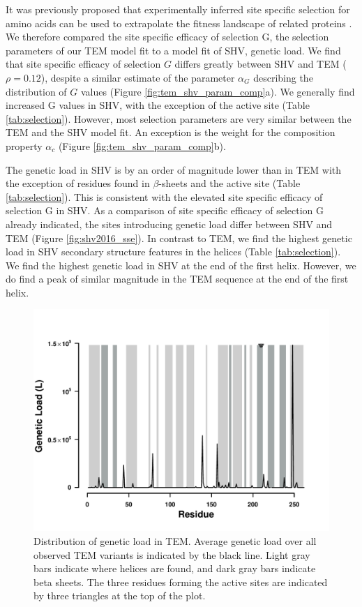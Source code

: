 \documentclass[12pt]{article}
\begin{document}
It was previously proposed that experimentally inferred site specific selection for amino acids can be used to extrapolate the fitness landscape of related proteins \citep{bloom2014, bloom2017}.
We therefore compared the site specific efficacy of selection G, the \selac selection parameters of our \selac TEM model fit to a \selac model fit of SHV, genetic load.
We find that site specific efficacy of selection $G$ differs greatly between SHV and TEM ($\rho = 0.12$), despite a similar estimate of the parameter $\alpha_G$ describing the distribution of $G$ values (Figure \ref{fig:tem_shv_param_comp}a).
We generally find increased G values in SHV, with the exception of the active site (Table \ref{tab:selection}).
However, most \selac selection parameters are very similar between the TEM and the SHV model fit. 
An exception is the weight for the \PC composition property $\alpha_c$ (Figure \ref{fig:tem_shv_param_comp}b).

The genetic load in SHV is by an order of magnitude lower than in TEM with the exception of residues found in $\beta$-sheets and the active site (Table \ref{tab:selection}).
This is consistent with the elevated site specific efficacy of selection G in SHV.
As a comparison of site specific efficacy of selection G already indicated, the sites introducing genetic load differ between SHV and TEM (Figure \ref{fig:shv2016_sse}).
In contrast to TEM, we find the highest genetic load in SHV secondary structure features in the helices (Table \ref{tab:selection}).
We find the highest genetic load in SHV at the end of the first helix.
However, we do find a peak of similar magnitude in the TEM sequence at the end of the first helix.

\begin{figure}[H]
     \centering
	\includegraphics[width=\textwidth]{img/GL_slide_TEM2016}
	\caption{Distribution of genetic load in TEM. 
	Average genetic load over all observed TEM variants is indicated by the black line. 
	Light gray bars indicate where helices are found, and dark gray bars indicate beta sheets.
	The three residues forming the active sites are indicated by three triangles at the top of the plot.}
	\label{fig:tem2016_sse}
\end{figure}
\end{document}
